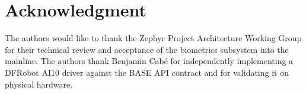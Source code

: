 \section*{Acknowledgment}

The authors would like to thank the Zephyr Project Architecture Working Group for their technical review and acceptance of the biometrics subsystem into the mainline. The authors thank Benjamin Cabé for independently implementing a DFRobot AI10 driver against the BASE API contract and for validating it on physical hardware.